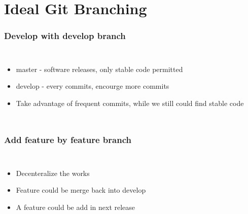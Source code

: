 \documentclass{beamer}
\begin{document}
\section{Ideal Git Branching}
\begin{frame}
	\frametitle{Develop with develop branch}	
	\begin{columns}[c]
	\column{1.5in}
	\begin{itemize}
		\item master - software releases, only stable code permitted
		\item develop - every commits, encourge more commits
		\item Take advantage of frequent commits, while we still could find stable code
	\end{itemize}
	\column{1.5in}
	\end{columns}
\end{frame}
\begin{frame}
	\frametitle{Add feature by feature branch}	
	\begin{columns}[c]
	\column{1.5in}
	\begin{itemize}
		\item Decenteralize the works
		\item Feature could be merge back into develop
		\item A feature could be add in next release
	\end{itemize}
	\column{1.5in}
	\end{columns}
\end{frame}
\end{document}
